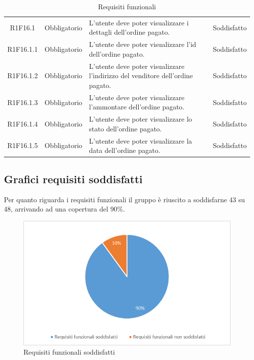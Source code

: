 \begin{table}[H]
\begin{tabular}{c | c | p{6cm} | c}
        R1F16.1                                                           & Obbligatorio & L'utente deve poter visualizzare i dettagli dell'ordine pagato.                                                              & Soddisfatto   \\ 
        R1F16.1.1                                                           & Obbligatorio & L'utente deve poter visualizzare l'id dell'ordine pagato.                                                                    & Soddisfatto \\ 
        R1F16.1.2                                                           & Obbligatorio & L'utente deve poter visualizzare l'indirizzo del venditore dell'ordine pagato.                                               & Soddisfatto \\ 
        R1F16.1.3                                                           & Obbligatorio & L'utente deve poter visualizzare l'ammontare dell'ordine pagato.                                                             & Soddisfatto \\ 
        R1F16.1.4                                                           & Obbligatorio & L'utente deve poter visualizzare lo stato dell'ordine pagato.                                                                & Soddisfatto \\ 
        R1F16.1.5                                                           & Obbligatorio & L'utente deve poter visualizzare la data dell'ordine pagato.                                                                 & Soddisfatto \\
    \end{tabular}
    \caption{Requisiti funzionali}
\end{table}


\subsection{Grafici requisiti soddisfatti}
Per quanto riguarda i requisiti funzionali il gruppo \groupName{} è riuscito a soddisfarne 43 su 48, arrivando ad una copertura del 90\%.
\begin{figure}[htbp]
    \begin{center}
     \includegraphics{immagini/requisitiFunzionali.png}
     \caption{Requisiti funzionali soddisfatti}
    \end{center}
 \end{figure}    
 

